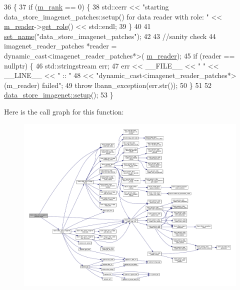 \begin{DoxyCode}
36                                         \{
37   \textcolor{keywordflow}{if} (\hyperlink{classlbann_1_1generic__data__store_a87695bfd2d1ed0dbe01d99108e3f68b7}{m\_rank} == 0) \{
38     std::cerr << \textcolor{stringliteral}{"starting data\_store\_imagenet\_patches::setup() for data reader with role: "} << 
      \hyperlink{classlbann_1_1generic__data__store_afa49ced0ab64c632371ea52532a91ec2}{m\_reader}->\hyperlink{classlbann_1_1generic__data__reader_a92982e1b399f37e2ead5aa440883cba5}{get\_role}() << std::endl;
39   \}
40 
41   \hyperlink{classlbann_1_1generic__data__store_a853741295a07b5687921fc56d0d7d5b2}{set\_name}(\textcolor{stringliteral}{"data\_store\_imagenet\_patches"});
42 
43   \textcolor{comment}{//sanity check}
44   imagenet\_reader\_patches *reader = \textcolor{keyword}{dynamic\_cast<}imagenet\_reader\_patches*\textcolor{keyword}{>}(
      \hyperlink{classlbann_1_1generic__data__store_afa49ced0ab64c632371ea52532a91ec2}{m\_reader});
45   \textcolor{keywordflow}{if} (reader == \textcolor{keyword}{nullptr}) \{
46     std::stringstream err;
47     err << \_\_FILE\_\_ << \textcolor{stringliteral}{" "} << \_\_LINE\_\_ << \textcolor{stringliteral}{" :: "}
48         << \textcolor{stringliteral}{"dynamic\_cast<imagenet\_reader\_patches*>(m\_reader) failed"};
49     \textcolor{keywordflow}{throw} lbann\_exception(err.str());
50   \}
51 
52   \hyperlink{classlbann_1_1data__store__imagenet_a611aa1734a491c443396a077b49fe4fe}{data\_store\_imagenet::setup}();
53 \}
\end{DoxyCode}
Here is the call graph for this function\+:\nopagebreak
\begin{figure}[H]
\begin{center}
\leavevmode
\includegraphics[width=350pt]{classlbann_1_1data__store__imagenet__patches_aa8cfaf12c87f3dbbbb4fc808f6ca26ad_cgraph}
\end{center}
\end{figure}
